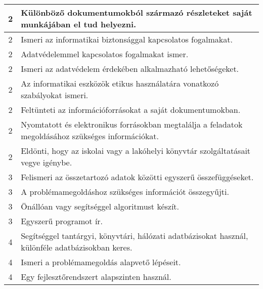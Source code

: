 \begin{longtable}{c | p{12cm} }
                                
                                          2 &  Különböző dokumentumokból származó részleteket saját munkájában el tud helyezni. \\ \hline
                                          2 &  Ismeri az informatikai biztonsággal kapcsolatos fogalmakat. \\ \hline
                                          2 &  Adatvédelemmel kapcsolatos fogalmakat ismer. \\ \hline
                                          2 &  Ismeri az adatvédelem érdekében alkalmazható lehetőségeket. \\ \hline
                                          2 &  Az informatikai eszközök etikus használatára vonatkozó szabályokat ismeri. \\ \hline
                                          2 &  Feltünteti az információforrásokat a saját dokumentumokban. \\ \hline
                                          2 &  Nyomtatott és elektronikus forrásokban megtalálja a feladatok megoldásához szükséges információkat. \\ \hline
                                          2 &  Eldönti, hogy az iskolai vagy a lakóhelyi könyvtár szolgáltatásait vegye igénybe. \\ \hline
                                      
                                
                                          3 &  Felismeri az összetartozó adatok közötti egyszerű összefüggéseket. \\ \hline
                                          3 &  A problémamegoldáshoz szükséges információt összegyűjti. \\ \hline
                                          3 &  Önállóan vagy segítséggel algoritmust készít. \\ \hline
                                          3 &  Egyszerű programot ír. \\ \hline
                                      
                                
                                          4 &  Segítséggel tantárgyi, könyvtári, hálózati adatbázisokat használ, különféle adatbázisokban keres. \\ \hline
                                          4 &  Ismeri a problémamegoldás alapvető lépéseit. \\ \hline
                                          4 &  Egy fejlesztőrendszert alapszinten használ. \\ \hline
                                      
                        \end{longtable}
            \clearpage

